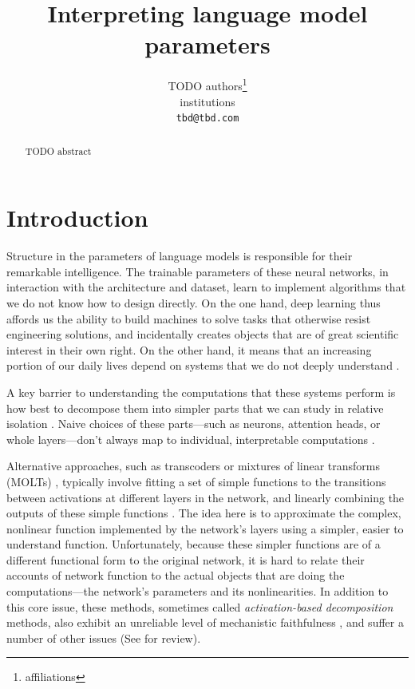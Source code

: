 \documentclass{article}
\title{Interpreting language model parameters}
\author{%
  TODO authors\thanks{affiliations} \\
   institutions\\
  \texttt{tbd@tbd.com} \\
}
\begin{document}
\newcommand{\code}[1]{\colorbox{codegray}{\texttt{\vphantom{Ap}#1}}}

\maketitle


\begin{abstract}
TODO abstract
\end{abstract}


\section{Introduction} 



Structure in the parameters of language models is responsible for their remarkable intelligence. The trainable parameters of these neural networks, in interaction with the architecture and dataset, learn to implement algorithms that we do not know how to design directly.
On the one hand, deep learning thus affords us the ability to build machines to solve tasks that otherwise resist engineering solutions, and incidentally creates objects that are of great scientific interest in their own right. On the other hand, it means that an increasing portion of our daily lives depend on systems that we do not deeply understand \cite{Bengio2026InternationalAISafety}.



A key barrier to understanding the computations that these systems perform is how best to decompose them into simpler parts that we can study in relative isolation \cite{mueller2024questrightmediatorhistory, sharkey2025openproblemsmechanisticinterpretability}. 
Naive choices of these parts---such as neurons, attention heads, or whole layers---don't always map to individual, interpretable computations \cite{hinton1981parallel, wei2015understandingintraclassknowledgeinside, nguyen2016multifacetedfeaturevisualizationuncovering, olah2017feature, janiak2023polysemantic, jermyn2023attention, yun2021sparse, lindsey2024crosscoders}. 

Alternative approaches, such as transcoders \cite{dunefsky2024transcodersinterpretablellmfeature, ameisen2025circuit} or mixtures of linear transforms (MOLTs) \cite{oldfield2025towards, lindsey2025molts}, typically involve fitting a set of simple functions to the transitions between activations at different layers in the network, and linearly combining the outputs of these simple functions . The idea here is to approximate the complex, nonlinear function implemented by the network's layers using a simpler, easier to understand function. Unfortunately, because these simpler functions are of a different functional form to the original network, it is hard to relate their accounts of network function to the actual objects that are doing the computations---the network's parameters and its nonlinearities. In addition to this core issue, these methods, sometimes called \textit{activation-based decomposition} methods, also exhibit an unreliable level of mechanistic faithfulness \cite{ameisen2025circuit}, and suffer a number of other issues (See \cite{sharkey2025openproblemsmechanisticinterpretability} for review).
\end{document}

